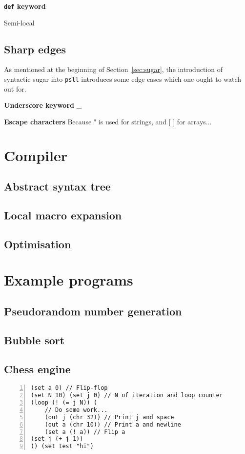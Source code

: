 \documentclass[aip,jcp,reprint]{revtex4-1}
\let\tt\texttt
\newcommand\psll{\texttt{psll}\xspace}
\begin{document}
\textbf{\tt{def} keyword}

Semi-local

\subsection{Sharp edges}\label{sec:sharp_edges}
As mentioned at the beginning of Section~\ref{sec:sugar}, the introduction of syntactic sugar into \psll introduces some edge cases which one ought to watch out for.

\textbf{Underscore keyword}
\_

\textbf{Escape characters}
Because " is used for strings, and [ ] for arrays...

\section{Compiler}
\subsection{Abstract syntax tree}
\subsection{Local macro expansion}\label{sec:macros}
\subsection{Optimisation}

\section{Example programs}
\subsection{Pseudorandom number generation}
\subsection{Bubble sort}
\subsection{Chess engine}

\begin{lstlisting}[language=psll,frame=tb,numbers=left,aboveskip=3mm,belowskip=3mm]
(set a 0) // Flip-flop
(set N 10) (set j 0) // N of iteration and loop counter
(loop (! (= j N)) (
    // Do some work...
    (out j (chr 32)) // Print j and space
    (out a (chr 10)) // Print a and newline
    (set a (! a)) // Flip a
(set j (+ j 1))
)) (set test "hi")
\end{lstlisting}
\end{document}
